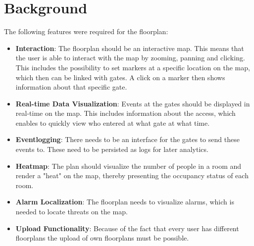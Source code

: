 \section{Background}

The following features were required for the floorplan:

\begin{itemize}
	\item \textbf{Interaction}:
	The floorplan should be an interactive map. This means that the user is able to interact with the map by zooming, panning and clicking. This includes the possibility to set markers at a specific location on the map, which then can be linked with gates. A click on a marker then shows information about that specific gate.
	\item \textbf{Real-time Data Visualization}:
	Events at the gates should be displayed in real-time on the map. This includes information about the access, which enables to quickly view who entered at what gate at what time.
	\item \textbf{Eventlogging}:
	There needs to be an interface for the gates to send these events to. These need to be persisted as logs for later analytics.
	\item \textbf{Heatmap}:
	The plan should visualize the number of people in a room and render a "heat" on the map, thereby presenting the occupancy status of each room.
	\item \textbf{Alarm Localization}:
	The floorplan needs to visualize alarms, which is needed to locate threats on the map.
	\item \textbf{Upload Functionality}:
	Because of the fact that every user has different floorplans the upload of own floorplans must be possible.
\end{itemize}

\clearpage